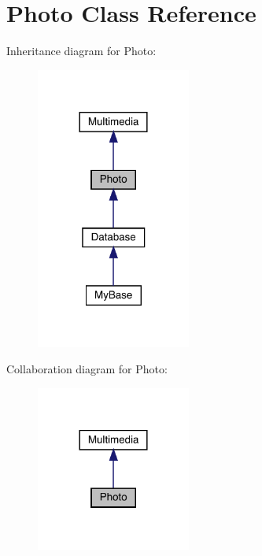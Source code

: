 \hypertarget{class_photo}{}\section{Photo Class Reference}
\label{class_photo}


Inheritance diagram for Photo\+:
\nopagebreak
\begin{figure}[H]
\begin{center}
\leavevmode
\includegraphics[width=144pt]{class_photo__inherit__graph}
\end{center}
\end{figure}


Collaboration diagram for Photo\+:
\nopagebreak
\begin{figure}[H]
\begin{center}
\leavevmode
\includegraphics[width=144pt]{class_photo__coll__graph}
\end{center}
\end{figure}
